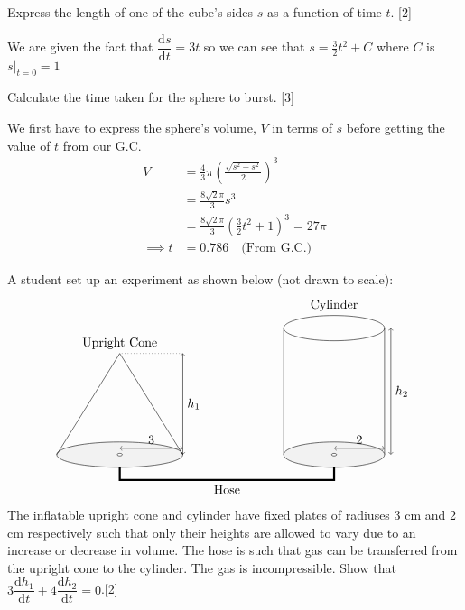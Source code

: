 \documentclass[12pt, a4 paper]{article}
\begin{document}
\begin{outline}[enumerate]
  \2 Express the length of one of the cube's sides $s$ as a function of time $t$. \hfill[2]
  \begin{answer}
    We are given the fact that $\dfrac{\mathrm{d}s}{\mathrm{d}t}=3t$ so we can see that $s=\frac{3}{2}t^2+C$ where $C$ is $s|_{t=0}=1$
  \end{answer}

  \2 Calculate the time taken for the sphere to burst. \hfill[3]
  \begin{answer}
    We first have to express the sphere's volume, $V$ in terms of $s$ before getting the value of $t$ from our G.C.
    \begin{align*}
      V &= \frac{4}{3}\pi \left(\frac{\sqrt{s^2+s^2}}{2}\right)^3 \\
      &= \frac{8\sqrt2\pi}{3}s^3 \\
      &= \frac{8\sqrt2\pi}{3}\left(\frac{3}{2}t^2+1\right)^3 = 27\pi \\
      \implies t &= 0.786 \quad\textrm{(From G.C.)}\quad
    \end{align*}
  \end{answer}

 \1 A student set up an experiment as shown below (not drawn to scale):
 \[
 \begin{tikzpicture}
   \filldraw[color=white!90!gray,draw=black] (0,0) ellipse (50pt and 10pt);
   \draw[<->](0,5pt) -- (25pt,5pt) node[above]{3} --   (50pt,5pt);
   \draw[<->](50pt,0pt) -- (50pt,40pt) node[right]{$h_{1}$} --   (50pt,80pt);
   \draw[dotted](50pt,80pt) -- (0,80pt);
   \draw (-50pt,0) -- (0,80pt) node[above]{Upright Cone} -- (50pt,0);
   \draw (130pt,0) -- (130pt,100pt);
   \draw (210pt,0) -- (210pt,100pt);
   \filldraw[color=white!90!gray,draw=black] (170pt,0) ellipse (40pt and 10pt);
   \draw[<->](170pt,5pt) -- (190pt,5pt) node[above]{2} --   (210pt,5pt);
   \draw[<->](215pt,0pt) -- (215pt,50pt) node[right]{$h_{2}$} --   (215pt,100pt);
   \draw (170pt, 110pt) node[above] {Cylinder};
   \draw (170pt,100pt) ellipse (40pt and 10pt);
   \draw[ultra thick] (0,-10pt) -- (0,-20pt) -- (85pt,-20pt) node[below]{Hose} -- (170pt,-20pt) -- (170pt, -10pt);
   \filldraw[color=white,draw=black] (0,0) ellipse (2pt and 1pt);
   \filldraw[color=white,draw=black] (170pt,0) ellipse (2pt and 1pt);
 \end{tikzpicture}
 \]
 The inflatable upright cone and cylinder have fixed plates of radiuses 3 cm and 2 cm  respectively such that only their heights are allowed to vary due to an increase or decrease in volume. The hose is such that gas can be transferred from the upright cone to the cylinder. The gas is incompressible. %
 \2 Show that $3\dfrac{\mathrm{d}h_{1}}{\mathrm{d}t}+4\dfrac{\mathrm{d}h_{2}}{\mathrm{d}t}=0$.\hfill[2]


\end{outline}
\end{document}
